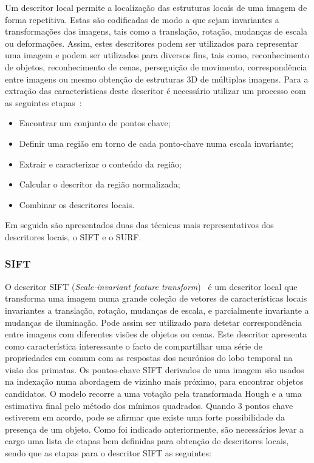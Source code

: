 Um descritor local permite a localização das estruturas locais de uma imagem de forma repetitiva. Estas são codificadas de modo a que sejam invariantes a transformações das imagens, tais como a translação, rotação, mudanças de escala ou deformações. Assim, estes descritores podem ser utilizados para representar uma imagem e podem ser utilizados para diversos fins, tais como, reconhecimento de objetos, reconhecimento de cenas, perseguição de movimento, correspondência entre imagens ou mesmo obtenção de estruturas 3D de múltiplas imagens. 
Para a extração das características deste descritor é necessário utilizar um processo com as seguintes etapas~\cite{Gauman2010}:

\begin{itemize}
\item Encontrar um conjunto de pontos chave;
\item Definir uma região em torno de cada ponto-chave numa escala invariante;
\item Extrair e caracterizar o conteúdo da região;
\item Calcular o descritor da região normalizada;
\item Combinar os descritores locais.
\end{itemize}

Em seguida são apresentados duas das técnicas mais representativos dos descritores locais, o SIFT e o SURF.

\subsubsection{SIFT} \label{subsubsec:sift}

O descritor SIFT (\textit{Scale-invariant feature transform})~\cite{Lowe1999, Lowe2004} é um descritor local que transforma uma imagem numa grande coleção de vetores de características locais invariantes a translação, rotação, mudanças de escala, e parcialmente invariante a mudanças de iluminação. Pode assim ser utilizado para detetar correspondência entre imagens com diferentes visões de objetos ou cenas.
Este descritor apresenta como característica interessante o facto de compartilhar uma série de propriedades em comum com as respostas dos neurónios do lobo temporal na visão dos primatas. Os pontos-chave SIFT derivados de uma imagem são usados na indexação numa abordagem de vizinho mais próximo, para encontrar objetos candidatos. O modelo recorre a uma votação pela transformada Hough e a uma estimativa final pelo método dos mínimos quadrados. Quando 3 pontos chave estiverem em acordo, pode se afirmar que existe uma forte possibilidade da presença de um objeto.
Como foi indicado anteriormente, são necessários levar a cargo uma lista de etapas bem definidas para obtenção de descritores locais, sendo que as etapas para o descritor SIFT as seguintes:

